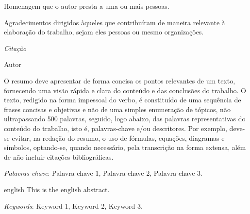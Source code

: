 \documentclass[
	12pt,				%
	openright,			%
	oneside,	
	a4paper,				%
	english,				%
	brazil				%
]{abntex2/abntex2} %
\begin{document}
\begin{dedicatoria}
   \vspace*{\fill}
   \noindent
   \leftskip=5cm

   Homenagem que o autor presta a uma ou mais pessoas.

   \vspace{5cm}
\end{dedicatoria}

\begin{agradecimentos}

Agradecimentos dirigidos àqueles que contribuíram de maneira relevante à elaboração do trabalho, sejam eles pessoas ou mesmo organizações.

\end{agradecimentos}

\begin{epigrafe}
    \vspace*{\fill}
	\begin{flushright}
		\textit{Citação}

		Autor
	\end{flushright}\vspace{4cm}
\end{epigrafe}


\setlength{\absparsep}{18pt} %
\begin{resumo}

 	O resumo deve apresentar de forma concisa os pontos relevantes de um texto, fornecendo uma visão rápida e clara do conteúdo e das conclusões do trabalho. O texto, redigido na forma impessoal do verbo, é constituído de uma sequência de frases concisas e objetivas e não de uma simples enumeração de tópicos, não ultrapassando 500 palavras, seguido, logo abaixo, das palavras representativas do conteúdo do trabalho, isto é, palavras-chave e/ou descritores. Por exemplo, deve-se evitar, na redação do resumo, o uso de fórmulas, equações, diagramas e símbolos, optando-se, quando necessário, pela transcrição na forma extensa, além de não incluir citações bibliográficas.

 \textit{Palavras-chave}: Palavra-chave 1, Palavra-chave 2, Palavra-chave 3.

\end{resumo}

\begin{resumo}[Abstract]
 \begin{otherlanguage*}{english}
   This is the english abstract.

   \vspace{\onelineskip}
 
   \noindent 
   \textit{Keywords}: Keyword 1, Keyword 2, Keyword 3.
 \end{otherlanguage*}
\end{resumo}
\end{document}
